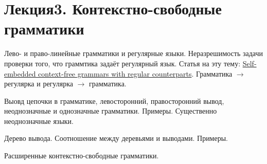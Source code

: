 \section{Лекция3. Контекстно-свободные грамматики}

Лево- и право-линейные грамматики и регулярные языки. Неразрешимость задачи проверки того, что граммтика задаёт регулярный язык. Статья на эту тему: \href{https://link.springer.com/article/10.1007/s00236-003-0133-8}{Self-embedded context-free grammars with regular counterparts}. Грамматика $\to$ регулярка и регулярка $\to$ грамматика.

Выовд цепочки в грамматике, левосторонний, правосторонний вывод, неоднозначные и однозначные грамматики. Примеры.
Существенно неоднозначные языки.

Дерево вывода. Соотношение между деревьями и выводами. Примеры.

Расширенные контекстно-свободные грамматики.
